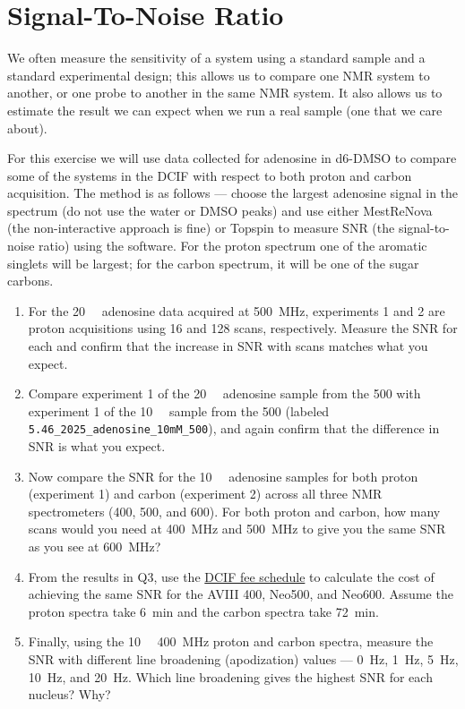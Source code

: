 \documentclass[../psets.tex]{subfiles}
\begin{document}
\section{Signal-To-Noise Ratio}
We often measure the sensitivity of a system using a standard sample and a standard experimental design; this allows us to compare one NMR system to another, or one probe to another in the same NMR system. It also allows us to estimate the result we can expect when we run a real sample (one that we care about).\par
For this exercise we will use data collected for adenosine in d6-DMSO to compare some of the systems in the DCIF with respect to both proton and carbon acquisition. The method is as follows --- choose the largest adenosine signal in the spectrum (do not use the water or DMSO peaks) and use either MestReNova (the non-interactive approach is fine) or Topspin to measure SNR (the signal-to-noise ratio) using the software. For the proton spectrum one of the aromatic singlets will be largest; for the carbon spectrum, it will be one of the sugar carbons.
\begin{enumerate}
    \item For the \SI{20}{\milli\molar} adenosine data acquired at \SI{500}{\mega\hertz}, experiments 1 and 2 are proton acquisitions using 16 and 128 scans, respectively. Measure the SNR for each and confirm that the increase in SNR with scans matches what you expect.
    \item Compare experiment 1 of the \SI{20}{\milli\molar} adenosine sample from the 500 with experiment 1 of the \SI{10}{\milli\molar} sample from the 500 (labeled \verb|5.46_2025_adenosine_10mM_500|), and again confirm that the difference in SNR is what you expect.
    \item Now compare the SNR for the \SI{10}{\milli\molar} adenosine samples for both proton (experiment 1) and carbon (experiment 2) across all three NMR spectrometers (400, 500, and 600). For both proton and carbon, how many scans would you need at \SI{400}{\mega\hertz} and \SI{500}{\mega\hertz} to give you the same SNR as you see at \SI{600}{\mega\hertz}?
    \item From the results in Q3, use the \href{https://chemistry.mit.edu/facilities-and-centers/department-of-chemistry-instrumentation-facility-dcif/}{DCIF fee schedule} to calculate the cost of achieving the same SNR for the AVIII 400, Neo500, and Neo600. Assume the proton spectra take \SI{6}{\minute} and the carbon spectra take \SI{72}{\minute}.
    \item Finally, using the \SI{10}{\milli\molar} \SI{400}{\mega\hertz} proton and carbon spectra, measure the SNR with different line broadening (apodization) values --- \SI{0}{\hertz}, \SI{1}{\hertz}, \SI{5}{\hertz}, \SI{10}{\hertz}, and \SI{20}{\hertz}. Which line broadening gives the highest SNR for each nucleus? Why?
\end{enumerate}
\end{document}
